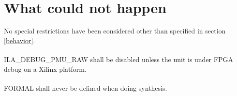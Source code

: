 \section{What could not happen}
No special restrictions have been considered other than specified  in section \ref{behavior}.\\
\\
ILA\_DEBUG\_PMU\_RAW shall be disabled unless the unit is under FPGA debug on a Xilinx platform.\\
\\
FORMAL shall never be defined when doing synthesis. 